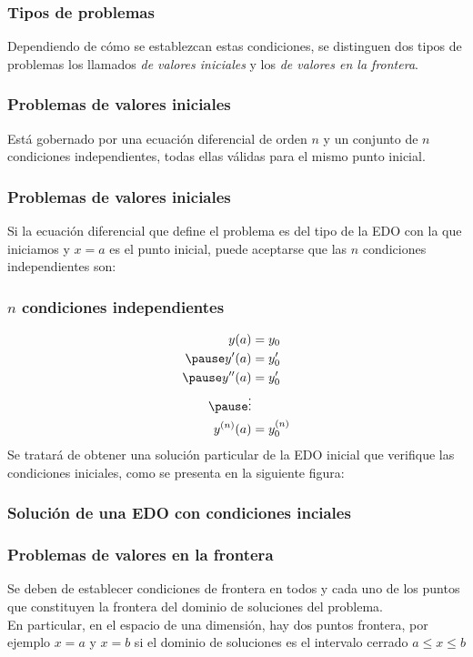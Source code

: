 \documentclass[12pt]{beamer}
\begin{document}
\begin{frame}
\frametitle{Tipos de problemas}
Dependiendo de cómo se establezcan estas condiciones, se distinguen dos tipos de problemas los llamados {\color{red}\textit{de valores iniciales}} y los {\color{ao}\textit{de valores en la frontera}}.
\end{frame}
\begin{frame}
\frametitle{Problemas de valores iniciales}
Está gobernado por una ecuación diferencial de orden $n$ y un conjunto de $n$ condiciones independientes, todas ellas válidas para el mismo punto inicial.
\end{frame}
\begin{frame}
\frametitle{Problemas de valores iniciales}
Si la ecuación diferencial que define el problema es del tipo de la EDO con la que iniciamos y $x = a$ es el punto inicial, puede aceptarse que las $n$ condiciones independientes son:
\end{frame}
\begin{frame}
\frametitle{$n$ condiciones independientes}
\begin{eqnarray*}
\begin{aligned}
y(a) & = y_{0} \\ \pause
\pderivada{y} (a) & = \pderivada{y}_{0} \\ \pause
\sderivada{y} (a) & = \pderivada{y}_{0} \\ \pause
\vdots \\
y^{(n)} (a) & = y^{(n)}_{0} 
\end{aligned}
\end{eqnarray*}
Se tratará de obtener una solución particular de la EDO inicial que verifique las condiciones iniciales, como se presenta en la siguiente figura:
\end{frame}
\begin{frame}[fragile]
\frametitle{Solución de una EDO con condiciones inciales}
\end{frame}
\begin{frame}
\frametitle{Problemas de valores en la frontera}
Se deben de establecer condiciones de frontera en todos y cada uno de los puntos que constituyen la frontera del dominio de soluciones del problema.
\\
\medskip
\pause
En particular, en el espacio de una dimensión, hay dos puntos frontera, por ejemplo $x = a$ y $x = b$ si el dominio de soluciones es el intervalo cerrado $a \leq x \leq b$
\end{frame}
\end{document}
